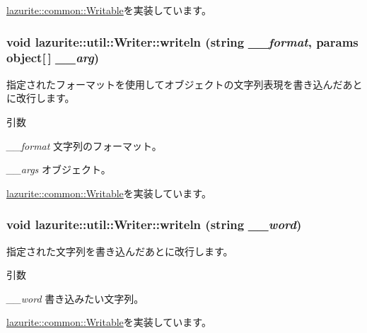\hyperlink{interfacelazurite_1_1common_1_1_writable_a3e89b67f8716f5b22cdae02e2e552706}{lazurite::common::Writable}を実装しています。\hypertarget{classlazurite_1_1util_1_1_writer_a94ba55d8211171403215e84c2da2b162}{
\subsubsection[{writeln}]{\setlength{\rightskip}{0pt plus 5cm}void lazurite::util::Writer::writeln (string {\em \_\-\_\-format}, \/  params object\mbox{[}$\,$\mbox{]} {\em \_\-\_\-arg})}}
\label{classlazurite_1_1util_1_1_writer_a94ba55d8211171403215e84c2da2b162}
指定されたフォーマットを使用してオブジェクトの文字列表現を書き込んだあとに改行します。 
\begin{DoxyParams}{引数}
\item[{\em \_\-\_\-format}]文字列のフォーマット。 \item[{\em \_\-\_\-args}]オブジェクト。 \end{DoxyParams}


\hyperlink{interfacelazurite_1_1common_1_1_writable_a44ea83effb9ad385e07938443a2685bb}{lazurite::common::Writable}を実装しています。\hypertarget{classlazurite_1_1util_1_1_writer_a38610a24a9bda46a3ba1e01617a4edf5}{
\subsubsection[{writeln}]{\setlength{\rightskip}{0pt plus 5cm}void lazurite::util::Writer::writeln (string {\em \_\-\_\-word})}}
\label{classlazurite_1_1util_1_1_writer_a38610a24a9bda46a3ba1e01617a4edf5}
指定された文字列を書き込んだあとに改行します。 
\begin{DoxyParams}{引数}
\item[{\em \_\-\_\-word}]書き込みたい文字列。 \end{DoxyParams}


\hyperlink{interfacelazurite_1_1common_1_1_writable_a8414621bb09a08186a73c2b9d0f60f3e}{lazurite::common::Writable}を実装しています。

